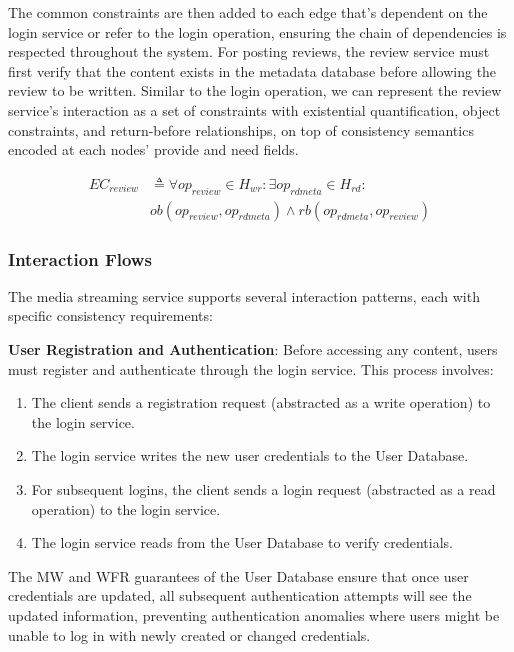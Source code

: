{The common constraints are then added to each edge that's dependent on the
login service or refer to the login operation, ensuring the chain
of dependencies is respected throughout the system. For posting reviews,
the review service must first verify that the content exists in the
metadata database before allowing the review to be written. Similar to
the login operation, we can represent the review service's interaction
as a set of constraints with existential quantification, object constraints,
and return-before relationships, on top of consistency semantics
encoded at each nodes' provide and need fields.

\begin{align*}
  EC_{review} &\triangleq \forall op_{review} \in H_{wr} : \exists
  op_{rdmeta} \in H_{rd} :\\
  &ob(op_{review}, op_{rdmeta}) \land rb(op_{rdmeta}, op_{review})
\end{align*}
}

\subsubsection{Interaction Flows}

The media streaming service supports several interaction patterns,
each with specific consistency requirements:

\textbf{User Registration and Authentication}: Before accessing any
content, users must register and authenticate through the login
service. This process involves:

\begin{enumerate}
\item The client sends a registration request (abstracted as a
  write operation) to the login service.
\item The login service writes the new user credentials to the User Database.
\item For subsequent logins, the client sends a login request
  (abstracted as a read operation) to the login service.
\item The login service reads from the User Database to verify credentials.
\end{enumerate}

The MW and WFR guarantees of the User Database ensure that once user
credentials are updated, all subsequent authentication attempts will
see the updated information, preventing authentication anomalies
where users might be unable to log in with newly created or changed credentials.

